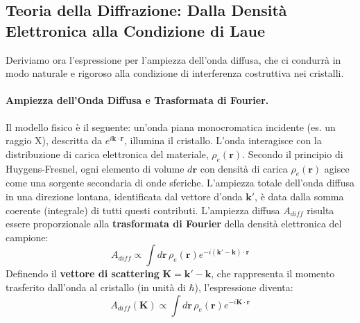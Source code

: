 \subsection{Teoria della Diffrazione: Dalla Densità Elettronica alla Condizione di Laue}
Deriviamo ora l'espressione per l'ampiezza dell'onda diffusa, che ci condurrà in modo naturale e rigoroso alla condizione di interferenza costruttiva nei cristalli.

\paragraph{Ampiezza dell'Onda Diffusa e Trasformata di Fourier.}
Il modello fisico è il seguente: un'onda piana monocromatica incidente (es. un raggio X), descritta da \(e^{i\mathbf{k} \cdot \mathbf{r}}\), illumina il cristallo. L'onda interagisce con la distribuzione di carica elettronica del materiale, \(\rho_e(\mathbf{r})\). Secondo il principio di Huygens-Fresnel, ogni elemento di volume \(d\mathbf{r}\) con densità di carica \(\rho_e(\mathbf{r})\) agisce come una sorgente secondaria di onde sferiche. L'ampiezza totale dell'onda diffusa in una direzione lontana, identificata dal vettore d'onda \(\mathbf{k'}\), è data dalla somma coerente (integrale) di tutti questi contributi. L'ampiezza diffusa \(A_{diff}\) risulta essere proporzionale alla \textbf{trasformata di Fourier} della densità elettronica del campione:
\[ A_{diff} \propto \int d\mathbf{r} \, \rho_e(\mathbf{r}) e^{-i(\mathbf{k'}-\mathbf{k})\cdot\mathbf{r}} \]
Definendo il \textbf{vettore di scattering} \(\mathbf{K} = \mathbf{k'} - \mathbf{k}\), che rappresenta il momento trasferito dall'onda al cristallo (in unità di \(\hbar\)), l'espressione diventa:
\[ A_{diff}(\mathbf{K}) \propto \int d\mathbf{r} \, \rho_e(\mathbf{r}) e^{-i\mathbf{K}\cdot\mathbf{r}} \]

